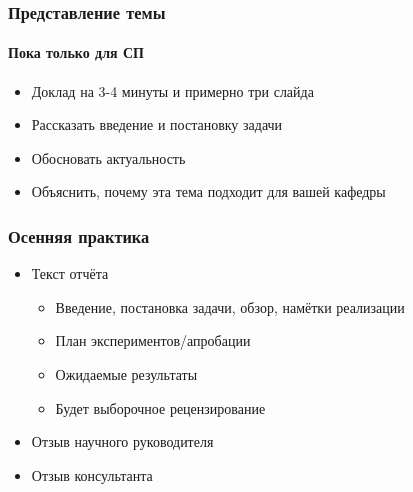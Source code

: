 \documentclass{../../slides-style}
\begin{document}
    \begin{frame}
        \frametitle{Представление темы}
        \framesubtitle{Пока только для СП}
        \begin{itemize}
            \item Доклад на 3-4 минуты и примерно три слайда
            \item Рассказать введение и постановку задачи
            \item Обосновать актуальность
            \item Объяснить, почему эта тема подходит для вашей кафедры
        \end{itemize}
    \end{frame}

    \begin{frame}
        \frametitle{Осенняя практика}
        \begin{itemize}
            \item Текст отчёта
            \begin{itemize}
                \item Введение, постановка задачи, обзор, намётки реализации
                \item План экспериментов/апробации
                \item Ожидаемые результаты
                \item Будет выборочное рецензирование
            \end{itemize} 
            \item Отзыв научного руководителя
            \item Отзыв консультанта
        \end{itemize}
    \end{frame}
\end{document}
